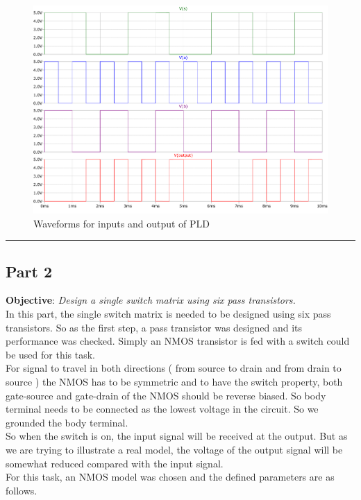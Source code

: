 \documentclass[a4paper,11pt]{article}%
\begin{document}
\begin{figure}[H]
	\centering
	\includegraphics[scale=0.5]{figures/2part1/wave.pdf}
	\caption{Waveforms for inputs and output of PLD }
\end{figure}

\hrule
\subsection{Part 2}
\textbf{Objective}: \textit{Design a single switch matrix using six pass transistors.}\\

In this part, the single switch matrix is needed to be designed using six pass transistors. So as the first step, a pass transistor was designed and its performance was checked. Simply an NMOS transistor is fed with a switch could be used for this task.\\

For signal to travel in both directions ( from source to drain and from drain to source ) the NMOS has to be symmetric and to have the switch property, both gate-source and gate-drain of the NMOS should be reverse biased. So body terminal needs to be connected as the lowest voltage in the circuit. So we grounded the body terminal.\\

So when the switch is on, the input signal will be received at the output. But as we are trying to illustrate a real model, the voltage of the output signal will be somewhat reduced compared with the input signal.\\

For this task, an NMOS model was chosen and the defined parameters are as follows.
\end{document}
